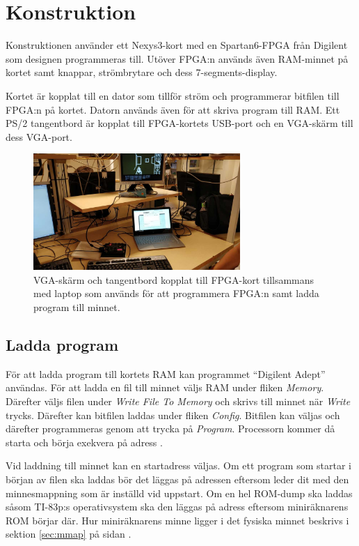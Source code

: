 \documentclass[main.tex]{subfiles}
\begin{document}
\clearpage
\section{Konstruktion}
Konstruktionen använder ett Nexys3-kort med en Spartan6-FPGA från Digilent som
designen programmeras till. Utöver FPGA:n används även RAM-minnet på kortet
samt knappar, strömbrytare och dess 7-segments-display.

Kortet är kopplat till en dator som tillför ström och programmerar bitfilen
till FPGA:n på kortet. Datorn används även för att skriva program till RAM.
Ett PS/2 tangentbord är kopplat till FPGA-kortets USB-port och en VGA-skärm
till dess VGA-port.  

\begin{figure}
    \centering
    \includegraphics[width=0.7\textwidth,bb=0 0 1152 648]{img/setup_small.jpg}
    \caption{VGA-skärm och tangentbord kopplat till FPGA-kort tillsammans med
    laptop som används för att programmera FPGA:n samt ladda program till
    minnet.}
\end{figure}

\subsection{Ladda program}
För att ladda program till kortets RAM kan programmet ``Digilent Adept''
användas. För att ladda en fil till minnet väljs RAM under fliken {\it Memory}.
Därefter väljs filen under {\it Write File To Memory} och skrivs till minnet
när {\it Write} trycks. Därefter kan bitfilen laddas under fliken {\it Config}.
Bitfilen kan väljas och därefter programmeras genom att trycka på {\it
Program}. Processorn kommer då starta och börja exekvera på adress
.

Vid laddning till minnet kan en startadress väljas. Om ett program som startar
i början av filen ska laddas bör det läggas på adressen  eftersom
 leder dit med den minnesmappning som är inställd vid uppstart. Om
en hel ROM-dump ska laddas såsom TI-83p:s operativsystem ska den läggas på
adress  eftersom miniräknarens ROM börjar där. Hur miniräknarens
minne ligger i det fysiska minnet beskrivs i sektion \ref{sec:mmap} på sidan
\pageref{sec:mmap}.
\end{document}
